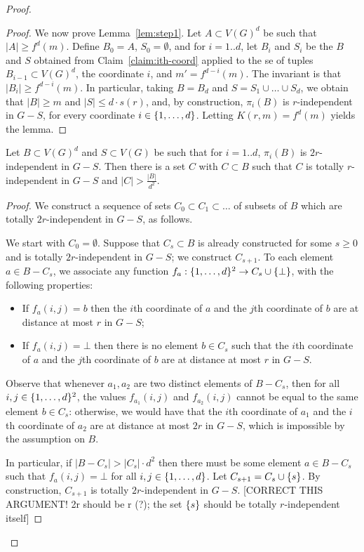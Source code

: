 \begin{proof}
\begin{proof}
We now prove Lemma~\ref{lem:step1}.
Let $A\subset V(G)^d$ be such that $|A|\ge f^d(m)$. 
Define $B_0=A$, $S_0=\emptyset$, and for $i=1..d$,
let $B_{i}$ and $S_i$ be the $B$ and $S$ obtained from  Claim~\ref{claim:ith-coord} applied to the se of tuples $B_{i-1}\subset V(G)^d$, the coordinate $i$, and $m'=f^{d-i}(m)$.  The invariant is that $|B_i|\ge f^{d-i}(m)$.
In particular, 
taking $B=B_d$ and $S=S_1\cup\ldots \cup S_d$, we obtain that $|B|\ge m$ and $|S|\le d\cdot s(r)$, and, by construction, $\pi_i(B)$
is $r$-independent in $G-S$, for every coordinate $i\in\{1,\ldots,d\}$. Letting $K(r,m)=f^d(m)$ yields the lemma.
\end{proof}


\begin{lemma}\label{lem:step2}
	Let $B\subset V(G)^d$ and $S\subset V(G)$ be such that for  $i=1..d$,
	$\pi_i(B)$ is $2r$-independent in $G-S$.
	Then there is a set $C$ with $C\subset B$ 
	such that $C$ is totally $r$-independent in $G-S$
	and $|C|> \frac{|B|}{d^2}$.
\end{lemma}
\begin{proof}
We construct a sequence of sets $C_0\subset C_1\subset \ldots$ of subsets of $B$ which are totally $2r$-independent in $G-S$, as follows.

We start with $C_0=\emptyset$. Suppose that $C_s\subset B$ is 
 already constructed for some $s\ge 0$
 and is totally $2r$-independent in $G-S$; we construct $C_{s+1}$.  To each element $a\in B-C_s$,
we associate any function $f_a:\{1,\ldots,d\}^2\to C_s\cup \{\bot\}$,
with the following properties:
\begin{itemize}
	\item If $f_a(i,j)=b$ then the $i$th coordinate of $a$
	and the $j$th coordinate of $b$ are at distance at most $r$
	in $G-S$;
	\item If $f_a(i,j)=\bot$ then there is no element $b\in C_s$ 
	such that the $i$th coordinate of $a$ and the $j$th coordinate of $b$ are at distance at most $r$ in $G-S$.	
\end{itemize}
Observe that whenever $a_1, a_2$ are two distinct elements of $B-C_s$,
then for all $i,j\in \{1,\ldots,d\}^2$, the values $f_{a_1}(i,j)$ and $f_{a_2}(i,j)$
cannot be equal to the same element $b\in C_s$:
otherwise, we would have that the $i$th coordinate of $a_1$
and the $i$th coordinate of $a_2$ are at distance at most $2r$
in $G-S$, which is impossible by the assumption on $B$.

In particular, if $|B-C_s|> |C_s|\cdot d^2$
then there must be some element  $a\in B-C_s$  
such that $f_a(i,j)=\bot$  for all $i,j\in\{1,\ldots,d\}$.
Let $C_{s+1}=C_s\cup \{s\}$.
By construction, $C_{s+1}$ is totally $2r$-independent in $G-S$.
[CORRECT THIS ARGUMENT! 2r should be r (?); the set $\{s\}$ should be totally $r$-independent itself]


\end{proof}
\end{proof}
